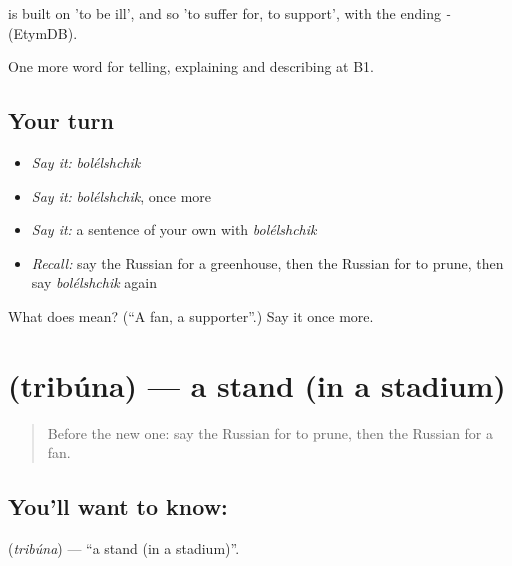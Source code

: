 \begin{cousinweb}
\emph{} is built on \emph{} 'to be ill', and so 'to suffer for, to support', with the ending \emph{-} (EtymDB).
\end{cousinweb}

\begin{grammarlens}[title={What you've built}]
One more word for telling, explaining and describing at B1.
\end{grammarlens}

\subsection*{Your turn}
\begin{itemize}
\raggedright
  \item \emph{Say it:} \emph{bolélshchik}
  \item \emph{Say it:} \emph{bolélshchik}, once more
  \item \emph{Say it:} a sentence of your own with \emph{bolélshchik}
  \item \emph{Recall:} say the Russian for a greenhouse, then the Russian for to prune, then say \emph{bolélshchik} again
\end{itemize}

\begin{tcolorbox}[breakable,colback=teal!4,colframe=teal!35!black,title={Before you move on}]
What does  mean? (\textquotedblleft{}A fan, a supporter\textquotedblright{}.) Say it once more.
\end{tcolorbox}
\section[\texorpdfstring{\ru{трибуна} (tribúna)}{трибуна (tribúna)}]{ (tribúna) — a stand (in a stadium)}

\label{lesson:RU-C508-tribuna}



\begin{quote}
Before the new one: say the Russian for to prune, then the Russian for a fan.
\end{quote}

\subsection*{You'll want to know: }
\textbf{} (\emph{tribúna}) — \textquotedblleft{}a stand (in a stadium)\textquotedblright{}.

